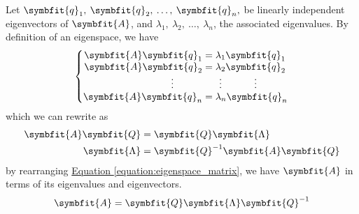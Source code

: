 \documentclass{article}
\begin{document}
	\begin{solution}[Proof]
		Let $\symbfit{q}_1,\: \symbfit{q}_2,\: \dots,\: \symbfit{q}_n,$ be linearly independent eigenvectors of $\symbfit{A}$, and $\lambda_1,\: \lambda_2,\: \dots,\: \lambda_n$, the associated eigenvalues. By definition of an eigenspace, we have
		\begin{equation*}
			\left\{
			\setlength\arraycolsep{0pt}
			\begin{array}{ r >{{}}c<{{}} l }
				\symbfit{A}\symbfit{q}_1 &=& \lambda_1 \symbfit{q}_1 \\
				\symbfit{A}\symbfit{q}_2 &=& \lambda_2 \symbfit{q}_2 \\
				\vdotswithin{\symbfit{q}_3} & & \vdotswithin{\lambda_3}\vdotswithin{\symbfit{q}_3} \\
				\symbfit{A}\symbfit{q}_n &=& \lambda_n \symbfit{q}_n
			\end{array}
			\right.
		\end{equation*}
		which we can rewrite as
		\begin{align}
			\symbfit{A}\symbfit{Q} &= \symbfit{Q}\symbfit{\Lambda} \label{equation:eigenspace_matrix} \\
			\symbfit{\Lambda}&=\symbfit{Q}^{-1}\symbfit{A}\symbfit{Q} \nonumber 
		\end{align}
		by rearranging \hyperref[equation:eigenspace_matrix]{Equation \ref{equation:eigenspace_matrix}}, we have $\symbfit{A}$ in terms of its eigenvalues and eigenvectors.
		\begin{equation*}
			\symbfit{A} = \symbfit{Q}\symbfit{\Lambda} \symbfit{Q}^{-1}
		\end{equation*}
	\end{solution}
\end{document}
